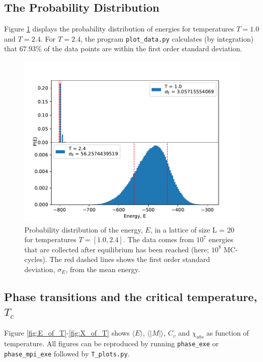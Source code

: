 \documentclass[12pt,english,a4paper]{article}
\begin{document}
\subsection{The Probability Distribution}
Figure \ref{fig:probability} displays the probability distribution of energies for temperatures $T=1.0$ and $T=2.4$. For $T=2.4$, the program \texttt{plot\_data.py} calculates (by integration) that $67.93\%$ of the data points are within the first order standard deviation.
\begin{figure}[H]
    \centering
    \includegraphics[scale=0.7]{Figures/Probability_Distribution_N_1000000000_L_20.pdf}
    \caption{Probability distribution of the energy, $E$, in a lattice of size L = 20 for temperatures $T = [1.0,2.4]$. The data comes from $10^7$ energies that are collected after equilibrium has been reached (here; $10^8$ MC-cycles). The red dashed lines shows the first order standard deviation, $\sigma_E$, from the mean energy.}
    \label{fig:probability}
\end{figure}

\newpage

\subsection{Phase transitions and the critical temperature, $T_c$}

Figure \ref{fig:E_of_T}-\ref{fig:X_of_T} shows $\langle E\rangle$, $\langle |M|\rangle$, $C_v$ and $\chi_{abs}$ as function of temperature. All figures can be reproduced by running \texttt{phase\_exe} or \texttt{phase\_mpi\_exe} followed by \texttt{T\_plots.py}.
\end{document}
